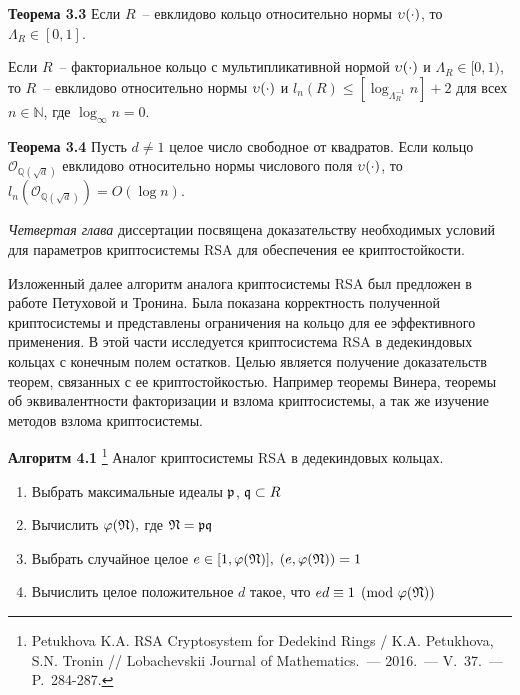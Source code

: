 \documentclass[_00_autoref.tex]{subfiles}
\begin{document}
\textbf{Теорема 3.3}\label{theorem:euclidean_and_lambda}
    Если $R$~-- евклидово кольцо относительно нормы $\upsilon(\cdot)$, то $\Lambda_R \in [0, 1]$.

    Если $R$~-- факториальное кольцо с мультипликативной нормой $\upsilon(\cdot)$ и $\Lambda_R \in [0, 1)$, то $R$~-- евклидово относительно нормы $\upsilon(\cdot)$ и $l_n(R) \le [\log_{\Lambda_R^{-1}} n] + 2$ для всех $n \in \mathbb{N}$, где $\log_{\infty} n = 0$.

\textbf{Теорема 3.4}
    Пусть $d \neq 1$ целое число свободное от квадратов.
    Если кольцо $\mathcal{O}_{\mathbb{Q}(\sqrt{d})}$ евклидово относительно нормы числового поля $\upsilon(\cdot)$, то $l_n(\mathcal{O}_{\mathbb{Q}(\sqrt{d})}) = O(\log n)$.


\emph{Четвертая глава} диссертации посвящена доказательству необходимых условий для параметров криптосистемы RSA для обеспечения ее криптостойкости.

Изложенный далее алгоритм аналога криптосистемы RSA был предложен в работе Петуховой и Тронина.
Была показана корректность полученной криптосистемы и представлены ограничения  на кольцо для ее эффективного применения.
В этой части исследуется криптосистема RSA в дедекиндовых кольцах с конечным полем остатков.
Целью является получение доказательств теорем, связанных с ее криптостойкостью.
Например теоремы Винера, теоремы об эквивалентности факторизации и взлома криптосистемы, а так же изучение методов взлома криптосистемы.

\textbf{Алгоритм 4.1}\label{algorithm:RSA_in_dedekind} \footnote{\small Petukhova K.A. RSA Cryptosystem for Dedekind Rings / K.A. Petukhova, S.N. Tronin // Lobachevskii Journal of Mathematics.~--- 2016.~--- V.~37.~--- P.~284-287.}
    Аналог криптосистемы RSA в дедекиндовых кольцах.

    \begin{enumerate}
        \item Выбрать максимальные идеалы $\mathfrak{p}$, $\mathfrak{q} \subset R$

        \item Вычислить $\varphi(\mathfrak{N}),$ где $\mathfrak{N} = \mathfrak{p} \mathfrak{q}$

        \item Выбрать случайное целое $e \in [1, \varphi(\mathfrak{N})],$ $(e, \varphi(\mathfrak{N}))=1$

        \item Вычислить целое положительное $d$ такое, что $ed \equiv 1 \pmod{\varphi(\mathfrak{N})}$
    \end{enumerate}
\end{document}
